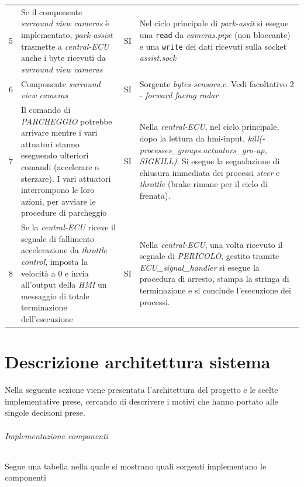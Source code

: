 \documentclass[11pt, openany]{article}
\theoremstyle{definition}
\theoremstyle{plain}
\theoremstyle{remark}
\begin{document}
\begin{tcolorbox}[width=\textwidth,move upwards= -16pt , colback={Cornsilk2}]
\begin{tabularx}{\textwidth}{lXcX}
					5	&	Se il componente \textit{surround view cameras} è implementato, \textit{park assist} trasmette a \textit{central-ECU} anche i byte ricevuti da \textit{surround view cameras}	&	SI	&
					Nel ciclo principale di \textit{park-assit} si esegue una \texttt{read} da \textit{cameras.pipe} (non bloccante) e una \texttt{write} dei dati ricevuti sulla socket \textit{assist.sock} \\\vspace{0.1cm}
					6	&	Componente \textit{surround view cameras}	&	SI	&
					Sorgente \textit{bytes-sensors.c}. Vedi facoltativo 2 - \textit{forward facing radar}	\\\vspace{0.1cm}
					7	&	Il comando di \textit{PARCHEGGIO} potrebbe arrivare mentre i vari attuatori stanno eseguendo ulteriori comandi (accelerare o sterzare). I vari attuatori interrompono le loro azioni, per avviare le procedure di parcheggio	&	SI	&
					Nella \textit{central-ECU}, nel ciclo principale, dopo la lettura da hmi-input, \textit{kill(-processes\_groups.actuators\_gro-up, SIGKILL)}. Si esegue la segnalazione di chiusura immediata dei processi  \textit{steer} e \textit{throttle} (brake rimane per il ciclo di frenata).\\
					8	&	Se la \textit{central-ECU }riceve il segnale di fallimento accelerazione da \textit{throttle control}, imposta la velocità a 0 e invia all'output della \textit{HMI} un messaggio di totale terminazione dell'esecuzione	&	SI	&
					Nella \textit{central-ECU}, una volta ricevuto il segnale di \textit{PERICOLO}, gestito tramite \textit{ECU\_signal\_handler} si esegue la procedura di arresto, stampa la stringa di terminazione e si conclude l'esecuzione dei processi.

				\end{tabularx}
				\label{tab:facoltativi}
			\end{tcolorbox}
	\part{Descrizione architettura sistema}
		Nella seguente sezione viene presentata l'architettura del progetto e le scelte implementative prese, cercando di descrivere i motivi che hanno portato alle singole decisioni prese.

		\paragraph{Implementazione componenti}
			\footnotesize Segue una tabella nella quale si mostrano quali sorgenti implementano le componenti
			\normalsize
\end{document}
